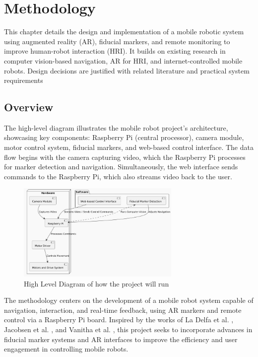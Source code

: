 \chapter{\label{ch:methodology} Methodology}
This chapter details the design and implementation of a mobile robotic system using augmented reality (AR), fiducial markers, and remote monitoring to improve human-robot interaction (HRI). It builds on existing research in computer vision-based navigation, AR for HRI, and internet-controlled mobile robots. Design decisions are justified with related literature and practical system requirements
\section{\label{sec:overview} Overview}

The high-level diagram illustrates the mobile robot project's architecture, showcasing key components: Raspberry Pi (central processor), camera module, motor control system, fiducial markers, and web-based control interface. The data flow begins with the camera capturing video, which the Raspberry Pi processes for marker detection and navigation. Simultaneously, the web interface sends commands to the Raspberry Pi, which also streams video back to the user. 

\begin{figure}[H]
    \centering
    \includegraphics[width=0.7\textwidth]{ch3/figs/diagram.png}
    \caption{High Level Diagram of how the project will run}
    \label{fig:high_level_diagram}
\end{figure}

The methodology centers on the development of a mobile robot system capable of navigation, interaction, and real-time feedback, using AR markers and remote control via a Raspberry Pi board. Inspired by the works of La Delfa et al. \cite{delfa2015}, Jacobsen et al. \cite{jacobsen2018}, and Vanitha et al. \cite{vanitha2016}, this project seeks to incorporate advances in fiducial marker systems and AR interfaces to improve the efficiency and user engagement in controlling mobile robots.

